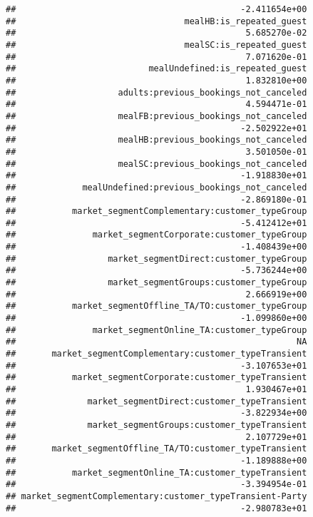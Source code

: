 \documentclass[
]{article}
\begin{document}
\begin{verbatim}
##                                            -2.411654e+00 
##                                 mealHB:is_repeated_guest 
##                                             5.685270e-02 
##                                 mealSC:is_repeated_guest 
##                                             7.071620e-01 
##                          mealUndefined:is_repeated_guest 
##                                             1.832810e+00 
##                    adults:previous_bookings_not_canceled 
##                                             4.594471e-01 
##                    mealFB:previous_bookings_not_canceled 
##                                            -2.502922e+01 
##                    mealHB:previous_bookings_not_canceled 
##                                             3.501050e-01 
##                    mealSC:previous_bookings_not_canceled 
##                                            -1.918830e+01 
##             mealUndefined:previous_bookings_not_canceled 
##                                            -2.869180e-01 
##           market_segmentComplementary:customer_typeGroup 
##                                            -5.412412e+01 
##               market_segmentCorporate:customer_typeGroup 
##                                            -1.408439e+00 
##                  market_segmentDirect:customer_typeGroup 
##                                            -5.736244e+00 
##                  market_segmentGroups:customer_typeGroup 
##                                             2.666919e+00 
##           market_segmentOffline_TA/TO:customer_typeGroup 
##                                            -1.099860e+00 
##               market_segmentOnline_TA:customer_typeGroup 
##                                                       NA 
##       market_segmentComplementary:customer_typeTransient 
##                                            -3.107653e+01 
##           market_segmentCorporate:customer_typeTransient 
##                                             1.930467e+01 
##              market_segmentDirect:customer_typeTransient 
##                                            -3.822934e+00 
##              market_segmentGroups:customer_typeTransient 
##                                             2.107729e+01 
##       market_segmentOffline_TA/TO:customer_typeTransient 
##                                            -1.189888e+00 
##           market_segmentOnline_TA:customer_typeTransient 
##                                            -3.394954e-01 
## market_segmentComplementary:customer_typeTransient-Party 
##                                            -2.980783e+01 

\end{verbatim}
\end{document}
